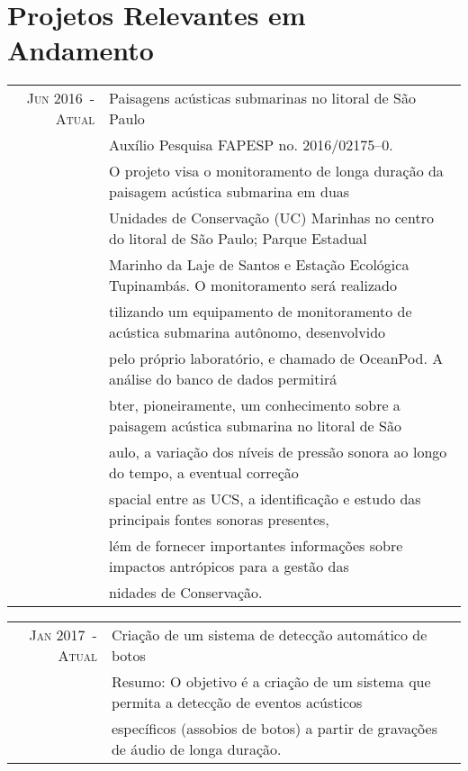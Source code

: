 \documentclass[a4paper,10pt]{article}
\begin{document}
\section{Projetos Relevantes em Andamento}
\begin{longtable}{rl}
    \textsc{Jun 2016~-~Atual}   & Paisagens acústicas submarinas no litoral de São Paulo\\
                                &\footnotesize{Auxílio Pesquisa FAPESP no. 2016/02175--0.}\\
                                &\footnotesize{O projeto visa o monitoramento de longa duração da paisagem acústica submarina em duas}\\ 
                                &\footnotesize{Unidades de Conservação (UC) Marinhas no centro do litoral de São Paulo; Parque Estadual}\\  
                                &\footnotesize{Marinho da Laje de Santos e Estação Ecológica Tupinambás. O monitoramento será realizado}\\ 
                                &\footnotesize{tilizando um equipamento de monitoramento de acústica submarina autônomo, desenvolvido}\\ 
                                &\footnotesize{pelo próprio laboratório, e chamado de OceanPod. A análise do banco de dados permitirá}\\ 
                                &\footnotesize{bter, pioneiramente, um conhecimento sobre a paisagem acústica submarina no litoral de São}\\
                                &\footnotesize{aulo, a variação dos níveis de pressão sonora ao longo do tempo, a eventual correção}\\ 
                                &\footnotesize{spacial entre as UCS, a identificação e estudo das principais fontes sonoras presentes,}\\ 
                                &\footnotesize{lém de fornecer importantes informações sobre impactos antrópicos para a gestão das}\\ 
                                &\footnotesize{nidades de Conservação.}\\
\end{longtable}

\begin{longtable}{rl}
    \textsc{Jan 2017~-~Atual}   & Criação de um sistema de detecção automático de botos\\
                                &\footnotesize{Resumo: O objetivo é a criação de um sistema que permita a detecção de eventos acústicos} \\ 
                                &\footnotesize{específicos (assobios de botos) a partir de gravações de áudio de longa duração.} \\
\end{longtable}
\end{document}
